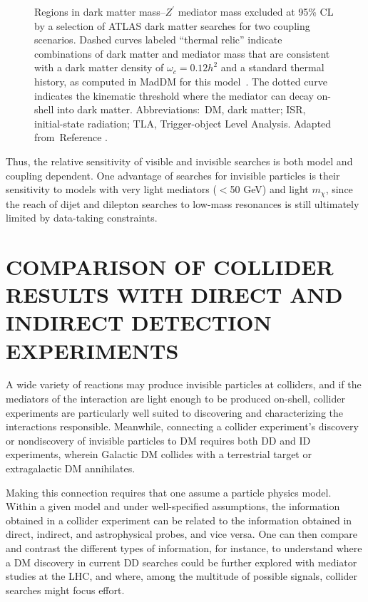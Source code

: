 \documentclass{ar-1col}
\newcommand{\chiDM}{\ensuremath{\chi}\xspace}
\newcommand{\IP}{invisible particle}
\newcommand{\mdm}{\ensuremath{m_{\chiDM}}\xspace}
\newcommand{\Zprime}{\ensuremath{{Z}^\prime}\xspace}
\begin{document}
\begin{figure}[!htpb]
\caption{Regions in dark matter mass--\Zprime mediator mass
excluded at 95\% CL by a selection of ATLAS dark matter searches
for two coupling scenarios. Dashed curves labeled ``thermal
relic'' indicate combinations of dark matter and mediator mass
that are consistent with a dark matter density of $\omega_c = 0.12
h^2$ and a standard thermal history, as computed in MadDM for this
model~\cite{Backovic:2015cra}. The dotted curve indicates the
kinematic threshold where the mediator can decay on-shell into
dark matter. Abbreviations:\ DM, dark matter; ISR, initial-state radiation; TLA, Trigger-object Level Analysis. Adapted from~Reference .}
\label{fig:sensitivityComparison}
\end{figure}

Thus, the relative sensitivity of visible and invisible searches
is both model and coupling dependent. One advantage of
searches for {\IP}s is their sensitivity to models
with very light mediators ($<$50 GeV) and light \mdm, since the
reach of dijet and dilepton searches to low-mass resonances is
still ultimately limited by data-taking constraints.

\section{COMPARISON OF COLLIDER RESULTS WITH DIRECT AND INDIRECT DETECTION EXPERIMENTS}\label{sec:04_Extrapolation}

A wide variety of reactions may produce {\IP}s at colliders, and
if the mediators of the interaction are light enough to be
produced on-shell, collider experiments are particularly well suited to
discovering and characterizing the interactions responsible.
Meanwhile, connecting a collider experiment's discovery or
nondiscovery of {\IP}s to DM requires both DD and
ID experiments, wherein Galactic DM
collides with a terrestrial target or extragalactic DM
annihilates.

Making this connection requires that one assume a particle
physics model. Within a given model and under well-specified
assumptions, the information obtained in a collider experiment can
be related to the information obtained in direct, indirect, and
astrophysical probes, and vice versa. One can then compare and
contrast the different types of information, for instance, to understand
where a DM discovery in current DD searches could be further
explored with mediator studies at the LHC, and where, among the
multitude of possible signals, collider searches might focus
effort.
\end{document}
